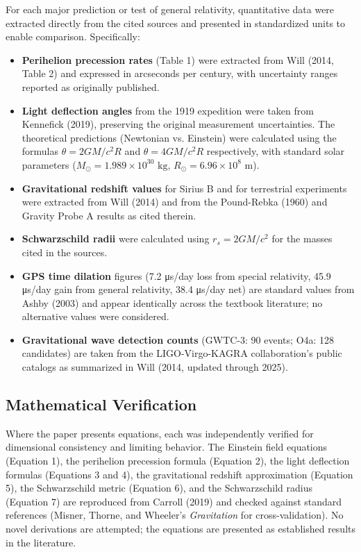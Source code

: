 \documentclass[12pt, a4paper]{article}
\begin{document}
	For each major prediction or test of general relativity, quantitative data were extracted directly from the cited sources and presented in standardized units to enable comparison. Specifically:
    \begin{itemize}
         \item\textbf{Perihelion precession rates} (Table 1) were extracted from Will (2014, Table 2) and expressed in arcseconds per century, with uncertainty ranges reported as originally published.
         \item\textbf{Light deflection angles} from the 1919 expedition were taken from Kennefick (2019), preserving the original measurement uncertainties. The theoretical predictions (Newtonian vs. Einstein) were calculated using the formulas \(\theta = 2GM/c^2R\) and \(\theta = 4GM/c^2R\) respectively, with standard solar parameters (\(M_\odot = 1.989 \times 10^{30}\text{ kg}\), \(R_\odot = 6.96 \times 10^8\text{ m}\)).
         \item\textbf{Gravitational redshift values} for Sirius B and for terrestrial experiments were extracted from Will (2014) and from the Pound-Rebka (1960) and Gravity Probe A results as cited therein.
         \item\textbf{Schwarzschild radii} were calculated using \(r_s = 2GM/c^2\) for the masses cited in the sources.
         \item\textbf{GPS time dilation} figures (7.2 μs/day loss from special relativity, 45.9 μs/day gain from general relativity, 38.4 μs/day net) are standard values from Ashby (2003) and appear identically across the textbook literature; no alternative values were considered.
         \item\textbf{Gravitational wave detection counts} (GWTC-3: 90 events; O4a: 128 candidates) are taken from the LIGO-Virgo-KAGRA collaboration's public catalogs as summarized in Will (2014, updated through 2025).
    \end{itemize}

	\subsection{Mathematical Verification}

	Where the paper presents equations, each was independently verified for dimensional consistency and limiting behavior. The Einstein field equations (Equation 1), the perihelion precession formula (Equation 2), the light deflection formulas (Equations 3 and 4), the gravitational redshift approximation (Equation 5), the Schwarzschild metric (Equation 6), and the Schwarzschild radius (Equation 7) are reproduced from Carroll (2019) and checked against standard references (Misner, Thorne, and Wheeler's \textit{Gravitation} for cross-validation). No novel derivations are attempted; the equations are presented as established results in the literature.
\end{document}
